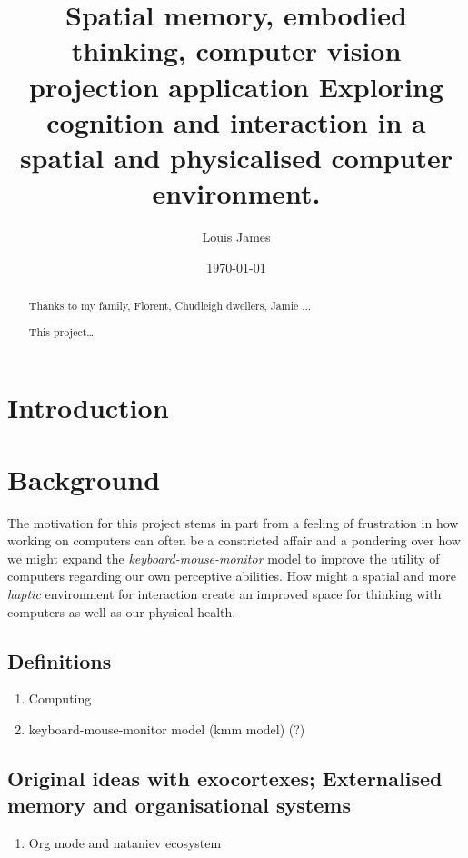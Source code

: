 \documentclass[12pt]{report}
\author{Louis James}
\date{\today}
\title{Spatial memory, embodied thinking, computer vision projection application Exploring cognition and interaction in a spatial and physicalised computer environment.}
\begin{document}
\maketitle

\renewcommand{\abstractname}{Acknowledgements}
\begin{abstract}
 Thanks to my family, Florent, Chudleigh dwellers, Jamie ...
\end{abstract}
\newpage

\renewcommand{\abstractname}{Abstract}
\begin{abstract}
This project\ldots{}
\end{abstract}
\tableofcontents
\chapter{Introduction}
\label{sec:org8488510}
\chapter{Background}
\label{sec:org433c78f}

The motivation for this project stems in part from a feeling of frustration in
how working on computers can often be a constricted affair and a pondering over
how we might expand the \emph{keyboard-mouse-monitor} model to improve the utility of
computers regarding our own perceptive abilities. How might a spatial and more
\emph{haptic} environment for interaction create an improved space for thinking with
computers as well as our physical health.

\section{Definitions}
\label{sec:org4b1fdaa}
\begin{enumerate}
\item Computing
\label{sec:org6fad5ee}
\item keyboard-mouse-monitor model (kmm model) (?)
\label{sec:org3da8ae6}
\end{enumerate}

\section{Original ideas with exocortexes; Externalised memory and organisational systems}
\label{sec:orga256be3}

\begin{enumerate}
\item Org mode and nataniev ecosystem
\label{sec:orga307022}
\end{enumerate}
\end{document}
